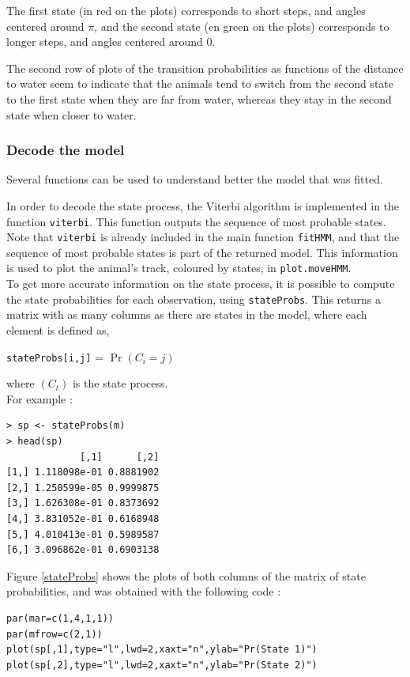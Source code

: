 \documentclass[]{article}
\begin{document}
The first state (in red on the plots) corresponds to short steps, and angles centered around $\pi$, and the second state (en green on the plots) corresponds to longer steps, and angles centered around $0$.

The second row of plots of the transition probabilities as functions of the distance to water seem to indicate that the animals tend to switch from the second state to the first state when they are far from water, whereas they stay in the second state when closer to water.

\subsubsection{Decode the model}
Several functions can be used to understand better the model that was fitted. 

In order to decode the state process, the Viterbi algorithm is implemented in the function \texttt{viterbi}. This function outputs the sequence of most probable states. Note that \texttt{viterbi} is already included in the main function \texttt{fitHMM}, and that the sequence of most probable states is part of the returned model. This information is used to plot the animal's track, coloured by states, in \texttt{plot.moveHMM}.\\

To get more accurate information on the state process, it is possible to compute the state probabilities for each observation, using \texttt{stateProbs}. This returns a matrix with as many columns as there are states in the model, where each element is defined as,
\begin{center}
	\texttt{stateProbs[i,j]} = $\Pr(C_i=j)$
\end{center}
where $(C_t)$ is the state process.\\

\noindent For example :
\begin{lstlisting}
> sp <- stateProbs(m)
> head(sp)
             [,1]      [,2]
[1,] 1.118098e-01 0.8881902
[2,] 1.250599e-05 0.9999875
[3,] 1.626308e-01 0.8373692
[4,] 3.831052e-01 0.6168948
[5,] 4.010413e-01 0.5989587
[6,] 3.096862e-01 0.6903138
\end{lstlisting}

Figure \ref{stateProbs} shows the plots of both columns of the matrix of state probabilities, and was obtained with the following code :
\begin{lstlisting}
par(mar=c(1,4,1,1))
par(mfrow=c(2,1))
plot(sp[,1],type="l",lwd=2,xaxt="n",ylab="Pr(State 1)")
plot(sp[,2],type="l",lwd=2,xaxt="n",ylab="Pr(State 2)")
\end{lstlisting}
\end{document}
